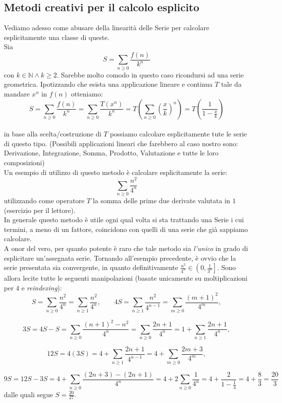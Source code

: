 \documentclass[a4paper,twoside]{article}
\newcommand{\N}{\mathbb{N}}
\theoremstyle{definition}
\numberwithin{theorem}{section}
\begin{document}
\subsection{Metodi creativi per il calcolo esplicito}
Vediamo adesso come abusare della linearità delle Serie per calcolare esplicitamente una classe di queste. \\
Sia
$$S=\sum_{n\geq 0}^{}\frac{f(n)}{k^n}$$
con $k\in\N \wedge k\geq 2$.
Sarebbe molto comodo in questo caso ricondursi ad una serie geometrica.
Ipotizzando che esista una applicazione lineare e continua $T$ tale da mandare $x^n$ in $f(n)$ otteniamo:
$$S=\sum_{n\geq 0}\frac{f(n)}{k^n}=\sum_{n\geq 0}\frac{T(x^n)}{k^n}= T\left(  \sum_{n\geq 0}\left(\frac{x}{k}\right)^n \right)= T \left(\frac{1}{1-\frac{x}{k}}\right)$$ \\
in base alla scelta/costruzione di $T$ possiamo calcolare esplicitamente tute le serie di questo tipo.
(Possibili applicazioni lineari che farebbero al caso nostro sono: Derivazione, Integrazione, Somma, Prodotto, Valutazione e tutte le loro composizioni)\\
Un esempio di utilizzo di questo metodo è calcolare esplicitamente la serie:
$$\sum_{n\geq 0}^{}\frac{n^2}{4^n}$$
utilizzando come operatore $T$ la somma delle prime due derivate valutata in $1$ (esercizio per il lettore).\\
In generale questo metodo è utile ogni qual volta si sta trattando una Serie i cui termini, a meno di un fattore, coincidono con quelli di una serie che già sappiamo calcolare.\\
A onor del vero, per quanto potente è raro che tale metodo sia \emph{l'unico} in grado di esplicitare un'assegnata serie. 
Tornando all'esempio precedente, è ovvio che la serie presentata sia convergente, in quanto definitivamente $\frac{n^2}{4^n}\in\left(0,\frac{1}{3^n}\right]$. 
Sono allora lecite tutte le seguenti manipolazioni (basate unicamente su moltiplicazioni per $4$ e \emph{reindexing}):
$$ S=\sum_{n\geq 0}\frac{n^2}{4^n}=\sum_{n\geq 1}\frac{n^2}{4^n},\qquad 4S=\sum_{n\geq 1}\frac{n^2}{4^{n-1}}=\sum_{m\geq 0}\frac{(m+1)^2}{4^m}, $$

$$ 3S=4S-S = \sum_{n\geq 0}\frac{(n+1)^2-n^2}{4^n}=\sum_{n\geq 0}\frac{2n+1}{4^n}=1+\sum_{n\geq 1}\frac{2n+1}{4^n},$$

$$ 12S=4(3S) = 4+\sum_{n\geq 1}\frac{2n+1}{4^{n-1}} = 4+\sum_{m\geq 0}\frac{2m+3}{4^m}, $$

$$ 9S = 12S-3S = 4+\sum_{n\geq 0}\frac{(2n+3)-(2n+1)}{4^n} = 4+2\sum_{n\geq 0}\frac{1}{4^n} = 4+\frac{2}{1-\frac{1}{4}} = 4+\frac{8}{3} = \frac{20}{3} $$
dalle quali segue $S=\frac{20}{27}$.
\end{document}
